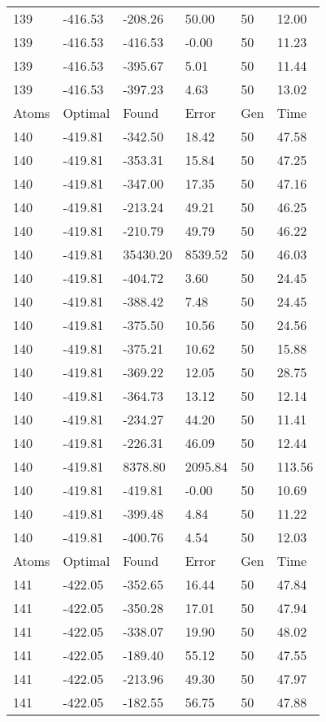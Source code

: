 \documentclass{report}
\begin{document}
\begin{appendix}
\begin{longtable}{llllll}
139 & -416.53 & -208.26 & 50.00 & 50 & 12.00 \\
139 & -416.53 & -416.53 & -0.00 & 50 & 11.23 \\
139 & -416.53 & -395.67 & 5.01 & 50 & 11.44 \\
139 & -416.53 & -397.23 & 4.63 & 50 & 13.02 \\
Atoms & Optimal & Found & Error & Gen & Time \\
140 & -419.81 & -342.50 & 18.42 & 50 & 47.58 \\
140 & -419.81 & -353.31 & 15.84 & 50 & 47.25 \\
140 & -419.81 & -347.00 & 17.35 & 50 & 47.16 \\
140 & -419.81 & -213.24 & 49.21 & 50 & 46.25 \\
140 & -419.81 & -210.79 & 49.79 & 50 & 46.22 \\
140 & -419.81 & 35430.20 & 8539.52 & 50 & 46.03 \\
140 & -419.81 & -404.72 & 3.60 & 50 & 24.45 \\
140 & -419.81 & -388.42 & 7.48 & 50 & 24.45 \\
140 & -419.81 & -375.50 & 10.56 & 50 & 24.56 \\
140 & -419.81 & -375.21 & 10.62 & 50 & 15.88 \\
140 & -419.81 & -369.22 & 12.05 & 50 & 28.75 \\
140 & -419.81 & -364.73 & 13.12 & 50 & 12.14 \\
140 & -419.81 & -234.27 & 44.20 & 50 & 11.41 \\
140 & -419.81 & -226.31 & 46.09 & 50 & 12.44 \\
140 & -419.81 & 8378.80 & 2095.84 & 50 & 113.56 \\
140 & -419.81 & -419.81 & -0.00 & 50 & 10.69 \\
140 & -419.81 & -399.48 & 4.84 & 50 & 11.22 \\
140 & -419.81 & -400.76 & 4.54 & 50 & 12.03 \\
Atoms & Optimal & Found & Error & Gen & Time \\
141 & -422.05 & -352.65 & 16.44 & 50 & 47.84 \\
141 & -422.05 & -350.28 & 17.01 & 50 & 47.94 \\
141 & -422.05 & -338.07 & 19.90 & 50 & 48.02 \\
141 & -422.05 & -189.40 & 55.12 & 50 & 47.55 \\
141 & -422.05 & -213.96 & 49.30 & 50 & 47.97 \\
141 & -422.05 & -182.55 & 56.75 & 50 & 47.88 \\

\end{longtable}
\end{appendix}
\end{document}
